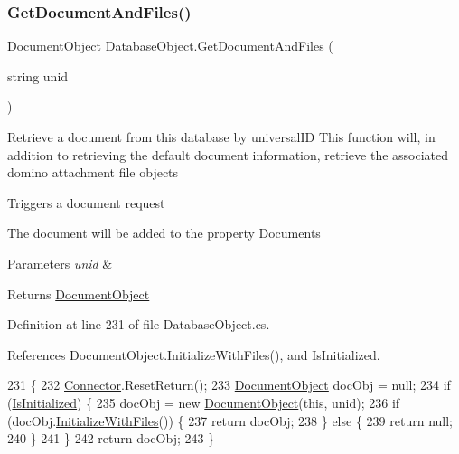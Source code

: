 \subsubsection{\texorpdfstring{Get\+Document\+And\+Files()}{GetDocumentAndFiles()}}
{\footnotesize\ttfamily \mbox{\hyperlink{class_document_object}{Document\+Object}} Database\+Object.\+Get\+Document\+And\+Files (\begin{DoxyParamCaption}\item[{string}]{unid }\end{DoxyParamCaption})}



Retrieve a document from this database by universal\+ID This function will, in addition to retrieving the default document information, retrieve the associated domino attachment file objects 

Triggers a document request

The document will be added to the property \textquotesingle{}Documents\textquotesingle{}


\begin{DoxyParams}{Parameters}
{\em unid} & \\
\hline
\end{DoxyParams}
\begin{DoxyReturn}{Returns}
\mbox{\hyperlink{class_document_object}{Document\+Object}}
\end{DoxyReturn}


Definition at line 231 of file Database\+Object.\+cs.



References Document\+Object.\+Initialize\+With\+Files(), and Is\+Initialized.


\begin{DoxyCode}
231                                                            \{
232         \mbox{\hyperlink{class_connector}{Connector}}.ResetReturn();
233         \mbox{\hyperlink{class_document_object}{DocumentObject}} docObj = null;
234         \textcolor{keywordflow}{if} (\mbox{\hyperlink{class_database_object_a5fe036d32a30eb10d1b3f6a30263f740}{IsInitialized}}) \{
235             docObj = \textcolor{keyword}{new} \mbox{\hyperlink{class_document_object}{DocumentObject}}(\textcolor{keyword}{this}, unid);
236             \textcolor{keywordflow}{if} (docObj.\mbox{\hyperlink{class_document_object_a83f0e855adc5fb7afd02d2e34767f5c8}{InitializeWithFiles}}()) \{
237                 \textcolor{keywordflow}{return} docObj;
238             \} \textcolor{keywordflow}{else} \{
239                 \textcolor{keywordflow}{return} null;
240             \}
241         \}
242         \textcolor{keywordflow}{return} docObj;
243     \}
\end{DoxyCode}
\mbox{\label{class_database_object_a9ad284130fc620b1745bc3fd8db505a5}} 
